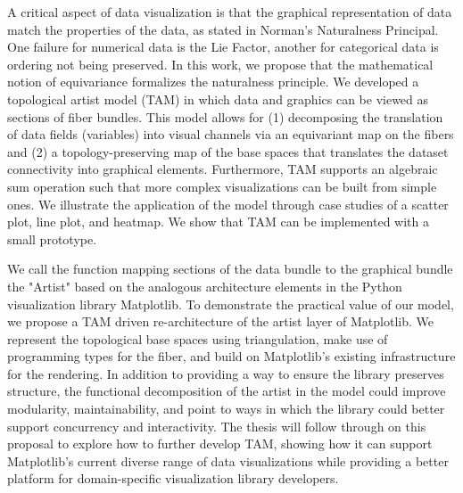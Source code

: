  A critical aspect of data visualization is that the graphical representation of data match the properties of the data, as stated in Norman's Naturalness Principal. One failure for numerical data is the Lie Factor, another for categorical data is ordering not being preserved. In this work, we propose that the mathematical notion of equivariance formalizes the naturalness principle. We developed a topological artist model (TAM) in which data and graphics can be viewed as sections of fiber bundles. This model allows for (1) decomposing the translation of data fields (variables) into visual channels via an equivariant map on the fibers and (2) a topology-preserving map of the base spaces that translates the dataset connectivity into graphical elements. Furthermore, TAM supports an algebraic sum operation such that more complex visualizations can be built from simple ones. We illustrate the application of the model through case studies of a scatter plot, line plot, and heatmap. We show that TAM can be implemented with a small prototype.

We call the function mapping sections of the data bundle to the graphical bundle the "Artist" based on the analogous architecture elements in the Python visualization library Matplotlib. To demonstrate the practical value of our model, we propose a TAM driven re-architecture of the artist layer of Matplotlib. We represent the topological base spaces using triangulation, make use of programming types for the fiber, and build on Matplotlib's existing infrastructure for the rendering. In addition to providing a way to ensure the library preserves structure, the functional decomposition of the artist in the model could improve modularity, maintainability, and point to ways in which the library could better support concurrency and interactivity. The thesis will follow through on this proposal to explore how to further develop TAM, showing how it can support Matplotlib's current diverse range of data visualizations while providing a better platform for domain-specific visualization library developers.
